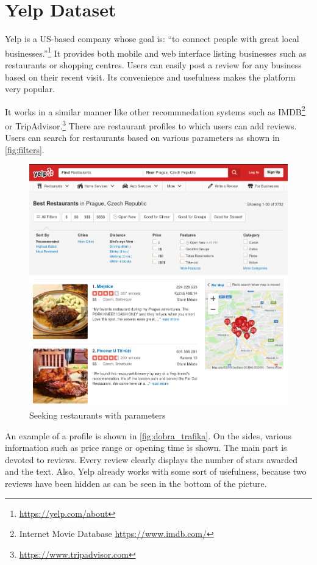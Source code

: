 \chapter{Yelp Dataset}\label{app:dataset}

Yelp is a US-based company whose goal is: ``to connect people with great local businesses.''\footnote{\url{https://yelp.com/about}}
It provides both mobile and web interface listing businesses such as restaurants or shopping centres.
Users can easily post a review for any business based on their recent visit.
Its convenience and usefulness makes the platform very popular.

It works in a similar manner like other recommnedation systems such as IMDB\footnote{Internet Movie Database \url{https://www.imdb.com/}} or
TripAdvisor.\footnote{\url{https://www.tripadvisor.com}}
There are restaurant profiles to which users can add reviews.
Users can search for restaurants based on various parameters as shown in \autoref{fig:filters}.

\begin{figure}[ht]\centering
\includegraphics[width=130mm]{../img/filters.png}
\caption{Seeking restaurants with parameters}
\label{fig:filters}
\end{figure}

An example of a profile is shown in \autoref{fig:dobra_trafika}.
On the sides, various information such as price range or opening time is shown.
The main part is devoted to reviews.
Every review clearly displays the number of stars awarded and the text.
Also, Yelp already works with some sort of usefulness,
because two reviews have been hidden as can be seen in the bottom of the picture.

